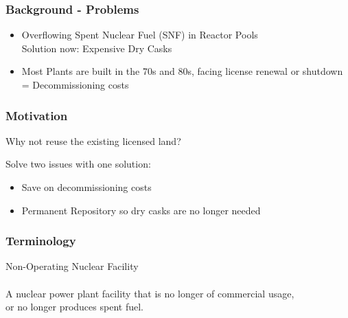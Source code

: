 \begin{frame}
	\frametitle{Background - Problems}
	\begin{itemize}
		\item Overflowing Spent Nuclear Fuel (SNF) in Reactor Pools\\
		Solution now: Expensive Dry Casks\\
		\item Most Plants are built in the 70s and 80s, facing license renewal or shutdown
		= Decommissioning costs
	\end{itemize}
\end{frame}

\begin{frame}
	\frametitle{Motivation}
	Why not reuse the existing licensed land?
	
	Solve two issues with one solution:
	\begin{itemize}
		\item Save on decommissioning costs
		\item Permanent Repository so dry casks are no longer needed
	\end{itemize}
\end{frame}

\begin{frame}
	\frametitle{Terminology}
	
	\fboxsep=0pt
		\hfill{
			\begin{minipage}[t]{0.48\linewidth}
				Non-Operating Nuclear Facility\\ \\
				A nuclear power plant facility that is no longer of commercial usage, \\
				or no longer produces spent fuel.
			\end{minipage}
		}
		
\end{frame}
